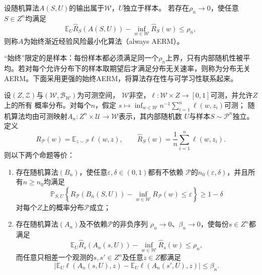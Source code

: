 \begin{definition}[始终渐近经验风险最小化]
\label{def:aerm}
设随机算法$A(S,U)$的输出属于$\mathcal W$，$U$独立于样本。
若存在$\rho_n\to0$，使任意$S\in Z^n$均满足
\[
 \mathbb E_U\hat R_S(A(S,U))-\inf_{w\in\mathcal W}\hat R_S(w)\leq\rho_n,
\]
则称$A$为始终渐近经验风险最小化算法（always AERM）。
\end{definition}

“始终”限定的是样本：每份样本都必须满足同一个$\rho_n$上界，只有内部随机性被平均。若对每个允许分布下的样本取期望后才满足分布无关速率，则称为分布无关AERM。下面采用更强的始终AERM，将算法存在性与可学习性联系起来。

\begin{theorem}
\label{thm:general-stability-characterization}
设$(Z,\mathcal Z)$与$(\mathcal W,\mathcal B_{\mathcal W})$为可测空间，
$\mathcal W$非空，$\ell:\mathcal W\times Z\to[0,1]$可测，并允许$Z$上的所有
概率分布。对每个$n$，假定
$s\mapsto\inf_{w\in\mathcal W}n^{-1}\sum_{i=1}^n\ell(w,z_i)$可测；
随机算法均由可测映射$A_n:Z^n\times\mathcal U\to\mathcal W$表示，其内部随机数
$U$与样本$S\sim\mathcal P^n$独立。定义
\[
 R_{\mathcal P}(w)=\mathbb E_{z\sim\mathcal P}\ell(w,z),
 \qquad
 \hat R_S(w)=\frac1n\sum_{i=1}^n\ell(w,z_i).
\]
则以下两个命题等价：
\begin{enumerate}
 \item 存在随机算法$(B_n)$，使任意$\varepsilon,\delta\in(0,1)$都有不依赖
 $\mathcal P$的$n_0(\varepsilon,\delta)$，并且所有$n\geq n_0$均满足
 \[
  \mathbb P_{S,U}\!\left\{
  R_{\mathcal P}(B_n(S,U))-\inf_{w\in\mathcal W}R_{\mathcal P}(w)
  \leq\varepsilon\right\}\geq1-\delta
 \]
 对每个$Z$上的概率分布$\mathcal P$成立；
 \item 存在随机算法$(A_n)$及不依赖$\mathcal P$的非负序列
 $\rho_n\to0$、$\beta_n\to0$，使每份$s\in Z^n$都满足
 \[
  \mathbb E_U\hat R_s(A_n(s,U))
  -\inf_{w\in\mathcal W}\hat R_s(w)\leq\rho_n,
 \]
 而任意只相差一个观测的$s,s'\in Z^n$及任意$z\in Z$都满足
 \[
  \left|\mathbb E_U\ell(A_n(s,U),z)
  -\mathbb E_U\ell(A_n(s',U),z)\right|\leq\beta_n.
 \]
\end{enumerate}
\end{theorem}
